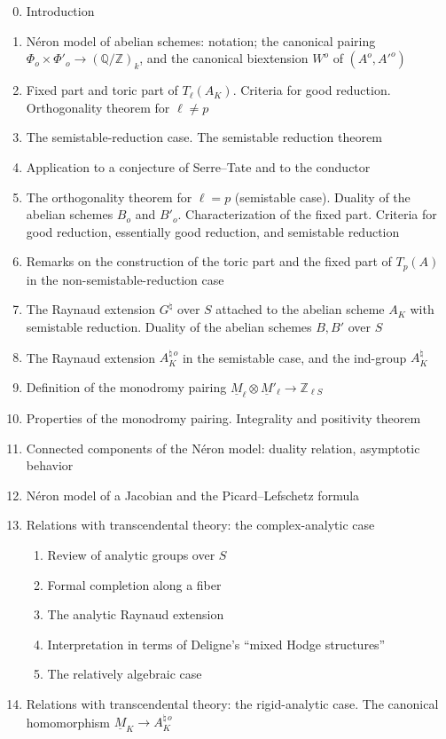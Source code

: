 \begin{enumerate}[label=\arabic*.]
\setcounter{enumi}{-1}
\item Introduction
\item N\'eron model of abelian schemes: notation; the canonical pairing
  $\Phi_o\times\Phi'_o\longrightarrow(\mathbb Q/\mathbb Z)_k$, and the
  canonical biextension $W^o$ of $(A^o,{A'}^o)$
\item Fixed part and toric part of $T_\ell(A_K)$. Criteria for good
  reduction. Orthogonality theorem for $\ell\ne p$
\item The semistable-reduction case. The semistable reduction theorem
\item Application to a conjecture of Serre--Tate and to the conductor
\item The orthogonality theorem for $\ell=p$ (semistable case). Duality
  of the abelian schemes $B_o$ and $B'_o$. Characterization of the fixed
  part. Criteria for good reduction, essentially good reduction, and
  semistable reduction
\item Remarks on the construction of the toric part and the fixed part
  of $T_p(A)$ in the non-semistable-reduction case
\item The Raynaud extension $G^\natural$ over $S$ attached to the
  abelian scheme $A_K$ with semistable reduction. Duality of the abelian
  schemes $B,B'$ over $S$
\item The Raynaud extension $A_K^{\natural\,o}$ in the semistable case,
  and the ind-group $A_K^\natural$
\item Definition of the monodromy pairing
  $\underline M_\ell\otimes\underline M'_\ell\longrightarrow
  \mathbb Z_{\ell S}$
\item Properties of the monodromy pairing. Integrality and positivity
  theorem
\item Connected components of the N\'eron model: duality relation,
  asymptotic behavior
\item N\'eron model of a Jacobian and the Picard--Lefschetz formula
\item Relations with transcendental theory: the complex-analytic case
  \begin{enumerate}[label=\arabic{enumi}.\arabic*.]
  \item Review of analytic groups over $S$
  \item Formal completion along a fiber
  \item The analytic Raynaud extension
  \item Interpretation in terms of Deligne's ``mixed Hodge structures''
  \item The relatively algebraic case
  \end{enumerate}
\item Relations with transcendental theory: the rigid-analytic case.
  The canonical homomorphism
  $\underline M_K\longrightarrow A_K^{\natural\,o}$
\end{enumerate}


